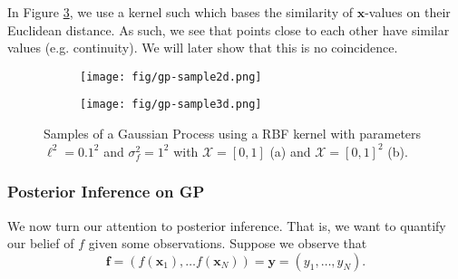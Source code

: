 In Figure \ref{fig:gp-sample}, we use a kernel such which bases the similarity of $\mathbf{x}$-values on their Euclidean distance.
As such, we see that points close to each other have similar values (e.g. continuity).
We will later show that this is no coincidence.

\begin{figure}
     \centering
     \begin{subfigure}[b]{0.45\textwidth}
         \centering
         \texttt{[image: fig/gp-sample2d.png]}
         \caption{}
         \label{subfig:2d-gp-sample}
     \end{subfigure}
     \hfill
     \begin{subfigure}[b]{0.45\textwidth}
         \centering
         \texttt{[image: fig/gp-sample3d.png]}
         \caption{}
         \label{subfig:3d-gp-sample}
     \end{subfigure}
     \hfill
    \caption{Samples of a Gaussian Process using a RBF kernel with parameters $\ell^{2} = 0.1^2$ and $\sigma^{2}_f = 1 ^ 2$ with
        $\mathcal{X} = [0, 1]$ (a) and $\mathcal{X} = [0, 1]^2$ (b).
    }
    \label{fig:gp-sample}
\end{figure}

\subsubsection{Posterior Inference on GP}

We now turn our attention to posterior inference.
That is, we want to quantify our belief of $f$ given some observations.
Suppose we observe that 
\begin{equation*}
    \mathbf{f} = (f(\mathbf{x}_1), \dots f(\mathbf{x}_N)) = \mathbf{y} = (y_1, \dots, y_N).
\end{equation*}

